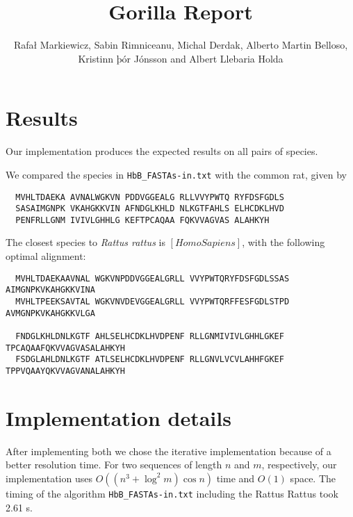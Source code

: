 \documentclass{tufte-handout}
\title{Gorilla Report}
\author{Rafał Markiewicz, Sabin Rimniceanu, Michal Derdak, Alberto Martin Belloso, Kristinn þór Jónsson and Albert Llebaria Holda}
\begin{document}
  \maketitle

  \section{Results}

  Our implementation produces the expected results on all pairs of species.%
  
  We compared the species in \verb!HbB_FASTAs-in.txt!
  with the common rat, given by

  \begin{verbatim}
  MVHLTDAEKA AVNALWGKVN PDDVGGEALG RLLVVYPWTQ RYFDSFGDLS
  SASAIMGNPK VKAHGKKVIN AFNDGLKHLD NLKGTFAHLS ELHCDKLHVD
  PENFRLLGNM IVIVLGHHLG KEFTPCAQAA FQKVVAGVAS ALAHKYH
  \end{verbatim}

  The closest species to \emph{Rattus rattus} is $[Homo Sapiens]$, with the following optimal alignment:

\medskip
  \begin{fullwidth}\small
  \begin{verbatim}
  MVHLTDAEKAAVNAL WGKVNPDDVGGEALGRLL VVYPWTQRYFDSFGDLSSAS AIMGNPKVKAHGKKVINA
  MVHLTPEEKSAVTAL WGKVNVDEVGGEALGRLL VVYPWTQRFFESFGDLSTPD AVMGNPKVKAHGKKVLGA

  FNDGLKHLDNLKGTF AHLSELHCDKLHVDPENF RLLGNMIVIVLGHHLGKEF TPCAQAAFQKVVAGVASALAHKYH
  FSDGLAHLDNLKGTF ATLSELHCDKLHVDPENF RLLGNVLVCVLAHHFGKEF TPPVQAAYQKVVAGVANALAHKYH

  \end{verbatim}
\end{fullwidth}



  \section{Implementation details}

  After implementing both we chose the iterative implementation because of a better resolution time.
  For two sequences of length $n$ and $m$, respectively, our implementation uses $O((n^3+\log^2 m)\cos n)$ time and
  $O(1)$ space. The timing of the algorithm  \verb!HbB_FASTAs-in.txt! including the Rattus Rattus took 2.61 s. 
\end{document}
